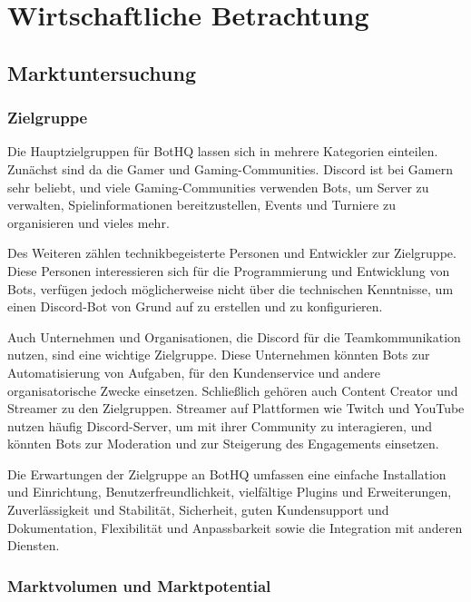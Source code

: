 
\section{Wirtschaftliche Betrachtung}\label{wirtschaftliche-betrachtung}

\subsection{Marktuntersuchung}\label{marktuntersuchung}

\subsubsection{Zielgruppe}\label{zielgruppe}

Die Hauptzielgruppen für BotHQ lassen sich in mehrere Kategorien einteilen. Zunächst sind da die Gamer und Gaming-Communities. Discord ist bei Gamern sehr beliebt, und viele Gaming-Communities verwenden Bots, um Server zu verwalten, Spielinformationen bereitzustellen, Events und Turniere zu organisieren und vieles mehr.

Des Weiteren zählen technikbegeisterte Personen und Entwickler zur Zielgruppe. Diese Personen interessieren sich für die Programmierung und Entwicklung von Bots, verfügen jedoch möglicherweise nicht über die technischen Kenntnisse, um einen Discord-Bot von Grund auf zu erstellen und zu konfigurieren.

Auch Unternehmen und Organisationen, die Discord für die Teamkommunikation nutzen, sind eine wichtige Zielgruppe. Diese Unternehmen könnten Bots zur Automatisierung von Aufgaben, für den Kundenservice und andere organisatorische Zwecke einsetzen. Schließlich gehören auch Content Creator und Streamer zu den Zielgruppen. Streamer auf Plattformen wie Twitch und YouTube nutzen häufig Discord-Server, um mit ihrer Community zu interagieren, und könnten Bots zur Moderation und zur Steigerung des Engagements einsetzen.

Die Erwartungen der Zielgruppe an BotHQ umfassen eine einfache Installation und Einrichtung, Benutzerfreundlichkeit, vielfältige Plugins und Erweiterungen, Zuverlässigkeit und Stabilität, Sicherheit, guten Kundensupport und Dokumentation, Flexibilität und Anpassbarkeit sowie die Integration mit anderen Diensten.

\subsubsection{Marktvolumen und Marktpotential}\label{marktvolumen-und-marktpotential}

